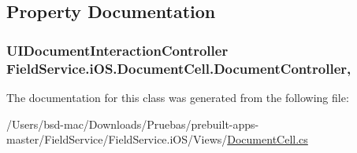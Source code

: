 \subsection{Property Documentation}
\hypertarget{class_field_service_1_1i_o_s_1_1_document_cell_a847ffb9cff3fdd3ab1667f4306bc0123}{
\subsubsection[{Document\+Controller}]{\setlength{\rightskip}{0pt plus 5cm}U\+I\+Document\+Interaction\+Controller Field\+Service.\+i\+O\+S.\+Document\+Cell.\+Document\+Controller\hspace{0.3cm}{\ttfamily [get]}, {\ttfamily [set]}}}\label{class_field_service_1_1i_o_s_1_1_document_cell_a847ffb9cff3fdd3ab1667f4306bc0123}


The documentation for this class was generated from the following file\+:\begin{DoxyCompactItemize}
\item 
/\+Users/bsd-\/mac/\+Downloads/\+Pruebas/prebuilt-\/apps-\/master/\+Field\+Service/\+Field\+Service.\+i\+O\+S/\+Views/\hyperlink{_document_cell_8cs}{Document\+Cell.\+cs}\end{DoxyCompactItemize}
